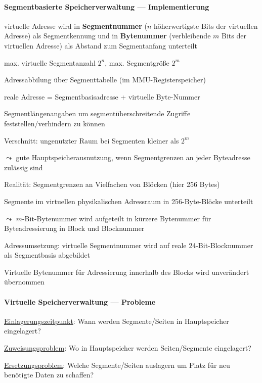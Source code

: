 \paragraph{Segmentbasierte Speicherverwaltung --- Implementierung}
\begin{items}
  \item virtuelle Adresse wird in \textbf{Segmentnummer} (\( n \) höherwertigste Bits der virtuellen Adresse) als Segmentkennung und in \textbf{Bytenummer} (verbleibende \( m \) Bits der virtuellen Adresse) als Abstand zum Segmentanfang unterteilt
  \item max. virtuelle Segmentanzahl \( 2^n \), max. Segmentgröße \( 2^m \)
  \item Adressabbilung über Segmenttabelle (im MMU-Registerspeicher)
  \item reale Adresse = Segmentbasisadresse + virtuelle Byte-Nummer
  \item Segmentlängenangaben um segmentüberschreitende Zugriffe feststellen/verhindern zu können
  \item Verschnitt: ungenutzter Raum bei Segmenten kleiner als \( 2^m \)
  \item \( \leadsto \) gute Hauptspeicherausnutzung, wenn Segmentgrenzen an jeder Byteadresse zulässig sind
  \item Realität: Segmentgrenzen an Vielfachen von Blöcken (hier 256 Bytes)
  \item Segmente im virtuellen physikalischen Adressraum in 256-Byte-Blöcke unterteilt
  \item \( \leadsto \) \( m \)-Bit-Bytenummer wird aufgeteilt in kürzere Bytenummer für Byteadressierung in Block und Blocknummer
  \item Adressumsetzung: virtuelle Segmentnummer wird auf reale 24-Bit-Blocknummer als Segmentbasis abgebildet
  \item Virtuelle Bytenummer für Adressierung innerhalb des Blocks wird unverändert übernommen
\end{items}

\newpage

\paragraph{Virtuelle Speicherverwaltung --- Probleme}
\begin{items}
  \item \underline{Einlagerungszeitpunkt}: Wann werden Segmente/Seiten in Hauptspeicher eingelagert?
  \item \underline{Zuweisungsproblem}: Wo in Hauptspeicher werden Seiten/Segmente eingelagert?
  \item \underline{Ersetzungsproblem}: Welche Segmente/Seiten auslagern um Platz für neu benötigte Daten zu schaffen?
\end{items}

